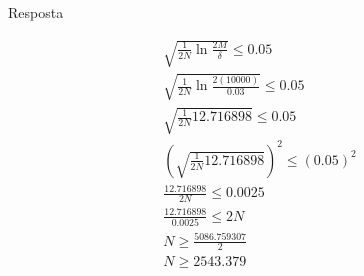  Resposta

\begin{align*}
	\sqrt{\frac{1}{2N} \ln{\frac{2M}{\delta}}} \le 0.05 \\
	\sqrt{\frac{1}{2N} \ln{\frac{2(10000)}{0.03}}} \le 0.05 \\
	\sqrt{\frac{1}{2N} {12.716898}} \le 0.05 \\
	\left( \sqrt{\frac{1}{2N} {12.716898}} \right) ^ {2} \le (0.05)^{2} \\
	\frac{12.716898}{2N} \le 0.0025 \\
	\frac{12.716898}{0.0025} \le 2N \\
	N \ge \frac{5086.759307}{2} \\
	N \ge {2543.379} \\
\end{align*}